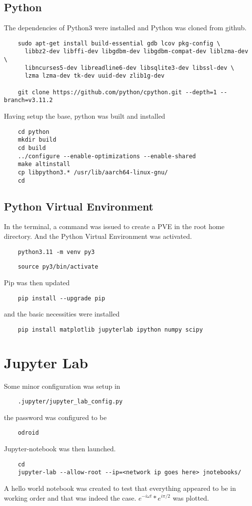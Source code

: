 \documentclass[11pt,letterpaper]{article}
\begin{document}
\subsection{Python}
The dependencies of Python3 were installed and Python was cloned from github.
\begin{verbatim}
    sudo apt-get install build-essential gdb lcov pkg-config \
      libbz2-dev libffi-dev libgdbm-dev libgdbm-compat-dev liblzma-dev \
      libncurses5-dev libreadline6-dev libsqlite3-dev libssl-dev \
      lzma lzma-dev tk-dev uuid-dev zlib1g-dev

    git clone https://github.com/python/cpython.git --depth=1 --branch=v3.11.2
\end{verbatim}
Having setup the base, python was built and installed
\begin{verbatim}
    cd python
    mkdir build
    cd build
    ../configure --enable-optimizations --enable-shared
    make altinstall
    cp libpython3.* /usr/lib/aarch64-linux-gnu/
    cd
\end{verbatim}
\subsection{Python Virtual Environment}
In the terminal, a command was issued to create a PVE in the root
home directory. And the Python Virtual Environment was activated.
\begin{verbatim}
    python3.11 -m venv py3
\end{verbatim}
\begin{verbatim}
    source py3/bin/activate
\end{verbatim}
Pip was then updated
\begin{verbatim}
    pip install --upgrade pip
\end{verbatim}
and the basic necessities were installed
\begin{verbatim}
    pip install matplotlib jupyterlab ipython numpy scipy
\end{verbatim}

\section{Jupyter Lab}
Some minor configuration was setup in
\begin{verbatim}
    .jupyter/jupyter_lab_config.py
\end{verbatim}
the password was configured to be 
\begin{verbatim}
    odroid 
\end{verbatim}
Jupyter-notebook was then launched.
\begin{verbatim}
    cd
    jupyter-lab --allow-root --ip=<network ip goes here> jnotebooks/
\end{verbatim}
A hello world notebook was created to test that everything appeared to be in working order and that
was indeed the case. $ e^{-i\omega t}* e^{i\pi/2} $ was plotted.
\newpage
\end{document}

